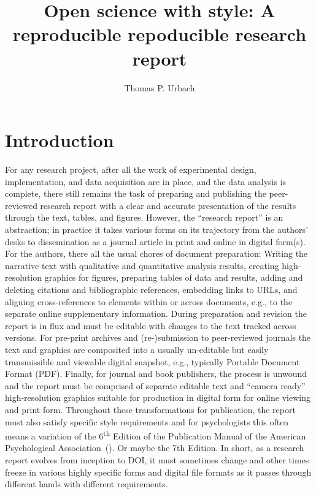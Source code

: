 \documentclass[helv,10pt,man,floatsintext]{apa6}  %
\title{Open science with style: A reproducible repoducible research report}
\author{Thomas P. Urbach}
\affiliation{
  Cognitive Science Department \\
  University of California, San Diego \\
  \today
}
\begin{document}
\maketitle

\section{Introduction}

For any research project, after all the work of experimental design,
implementation, and data acquisition are in place, and the data
analysis is complete, there still remains the task of preparing and
publishing the peer-reviewed research report with a clear and accurate
presentation of the results through the text, tables, and
figures. However, the ``research report'' is an abstraction; in
practice it takes various forms on its trajectory from the authors'
desks to dissemination as a journal article in print and online in
digital form(s). For the authors, there all the usual chores of
document preparation: Writing the narrative text with qualitative and
quantitative analysis results, creating high-resolution graphics for
figures, preparing tables of data and results, adding and deleting
citations and bibliographic references, embedding links to URLs, and
aligning cross-references to elements within or across documents,
e.g., to the separate online supplementary information. During
preparation and revision the report is in flux and must be editable
with changes to the text tracked across versions.  For pre-print
archives and (re-)submission to peer-reviewed journals the text and
graphics are composited into a usually un-editable but easily
transmissible and viewable digital snapshot, e.g., typically Portable
Document Format (PDF). Finally, for journal and book publishers, the
process is unwound and the report must be comprised of separate
editable text and ``camera ready'' high-resolution graphics suitable
for production in digital form for online viewing and print
form. Throughout these transformations for publication, the report
must also satisfy specific style requirements and for psychologists
this often means a variation of the 6\textsuperscript{th} Edition of
the Publication Manual of the American Psychological
Association~(\cite{APAStyle6th}). Or maybe the 7th Edition. In short,
as a research report evolves from inception to DOI, it must sometimes
change and other times freeze in various highly specific forms and
digital file formats as it passes through different hands with
different requirements.
\end{document}
